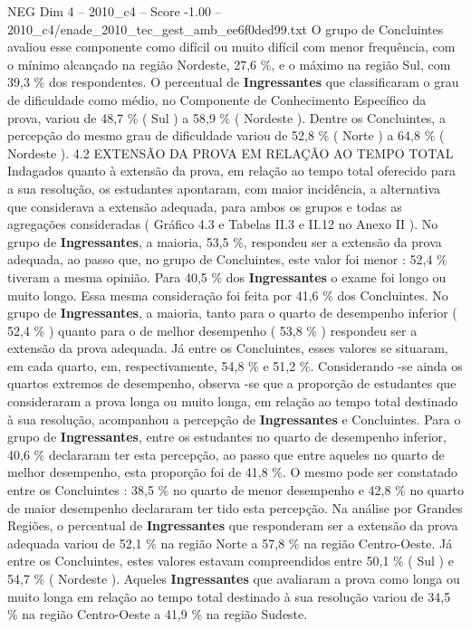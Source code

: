 \begin{textsample}{NEG Dim 4 – 2010\_c4 – Score -1.00 – 2010\_c4/enade\_2010\_tec\_gest\_amb\_ee6f0ded99.txt}
O grupo de Concluintes avaliou esse componente como difícil ou muito difícil com menor frequência, com o mínimo alcançado na região Nordeste, 27,6 \%, e o máximo na região Sul, com 39,3 \% dos respondentes.
O percentual de \textbf{Ingressantes} que classificaram o grau de dificuldade como médio, no Componente de Conhecimento Específico da prova, variou de 48,7 \% ( Sul ) a 58,9 \% ( Nordeste ).
Dentre os Concluintes, a percepção do mesmo grau de dificuldade variou de 52,8 \% ( Norte ) a 64,8 \% ( Nordeste ). 4.2 EXTENSÃO DA PROVA EM RELAÇÃO AO TEMPO TOTAL Indagados quanto à extensão da prova, em relação ao tempo total oferecido para a sua resolução, os estudantes apontaram, com maior incidência, a alternativa que considerava a extensão adequada, para ambos os grupos e todas as agregações consideradas ( Gráfico 4.3 e Tabelas II.3 e II.12 no Anexo II ).
No grupo de \textbf{Ingressantes}, a maioria, 53,5 \%, respondeu ser a extensão da prova adequada, ao passo que, no grupo de Concluintes, este valor foi menor : 52,4 \% tiveram a mesma opinião.
Para 40,5 \% dos \textbf{Ingressantes} o exame foi longo ou muito longo.
Essa mesma consideração foi feita por 41,6 \% dos Concluintes.
No grupo de \textbf{Ingressantes}, a maioria, tanto para o quarto de desempenho inferior ( 52,4 \% ) quanto para o de melhor desempenho ( 53,8 \% ) respondeu ser a extensão da prova adequada.
Já entre os Concluintes, esses valores se situaram, em cada quarto, em, respectivamente, 54,8 \% e 51,2 \%.
Considerando -se ainda os quartos extremos de desempenho, observa -se que a proporção de estudantes que consideraram a prova longa ou muito longa, em relação ao tempo total destinado à sua resolução, acompanhou a percepção de \textbf{Ingressantes} e Concluintes.
Para o grupo de \textbf{Ingressantes}, entre os estudantes no quarto de desempenho inferior, 40,6 \% declararam ter esta percepção, ao passo que entre aqueles no quarto de melhor desempenho, esta proporção foi de 41,8 \%.
O mesmo pode ser constatado entre os Concluintes : 38,5 \% no quarto de menor desempenho e 42,8 \% no quarto de maior desempenho declararam ter tido esta percepção.
Na análise por Grandes Regiões, o percentual de \textbf{Ingressantes} que responderam ser a extensão da prova adequada variou de 52,1 \% na região Norte a 57,8 \% na região Centro-Oeste.
Já entre os Concluintes, estes valores estavam compreendidos entre 50,1 \% ( Sul ) e 54,7 \% ( Nordeste ).
Aqueles \textbf{Ingressantes} que avaliaram a prova como longa ou muito longa em relação ao tempo total destinado à sua resolução variou de 34,5 \% na região Centro-Oeste a 41,9 \% na região Sudeste.

\end{textsample}
